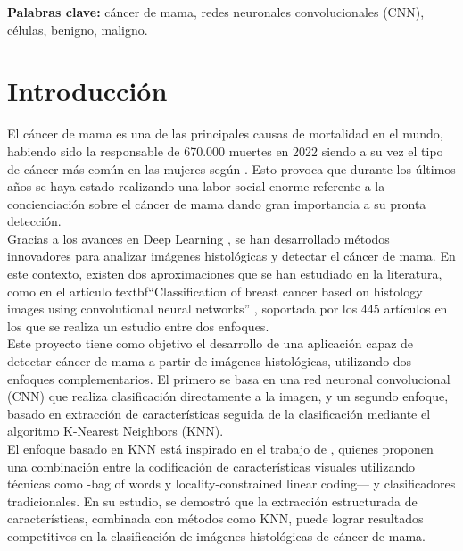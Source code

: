 \documentclass[12pt]{article} %
\begin{document}
\vspace{.5cm}

\textbf{Palabras clave:} cáncer de mama, redes neuronales convolucionales (CNN), células, benigno, maligno.

\newpage
\tableofcontents

\newpage

\section{Introducción}
El cáncer de mama es una de las principales causas de mortalidad en el mundo, habiendo sido la responsable de 670.000 muertes en 2022 siendo a su vez el tipo de cáncer más común en las mujeres según \cite{who_breast_cancer}. Esto provoca que durante los últimos años se haya estado realizando una labor social enorme referente a la concienciación sobre el cáncer de mama dando gran importancia a su pronta detección.\\

Gracias a los avances en Deep Learning \cite{shinde2018review}, se han desarrollado métodos innovadores para analizar imágenes histológicas y detectar el cáncer de mama. En este contexto, existen dos aproximaciones que se han estudiado en la literatura, como en el artículo textbf{“Classification of breast cancer based on histology images using convolutional neural networks}” \cite{bardou2018classification}, soportada por los 445 artículos en los que se realiza un estudio entre dos enfoques.\\

Este proyecto tiene como objetivo el desarrollo de una aplicación capaz de detectar cáncer de mama a partir de imágenes histológicas, utilizando dos enfoques complementarios. El primero se basa en una red neuronal convolucional (CNN) que realiza clasificación directamente a la imagen, y un segundo enfoque, basado en extracción de características seguida de la clasificación mediante el algoritmo K-Nearest Neighbors (KNN).\\

El enfoque basado en KNN está inspirado en el trabajo de \cite{bardou2018classification}, quienes proponen una combinación entre la codificación de características visuales utilizando técnicas como -bag of words y locality-constrained linear coding— y clasificadores tradicionales. En su estudio, se demostró que la extracción estructurada de características, combinada con métodos como KNN, puede lograr resultados competitivos en la clasificación de imágenes histológicas de cáncer de mama.\\
\end{document}
